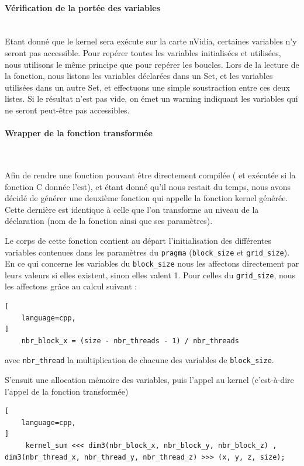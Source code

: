 \documentclass{article}
\begin{document}
	
	\paragraph{Vérification de la portée des variables}
	~~\\
	\indent
	Etant donné que le kernel sera exécute sur la carte nVidia, certaines variables n'y seront pas accessible. Pour repérer toutes les variables initialisées et utilisées, nous utilisons le même principe que pour repérer les boucles. Lors de la lecture de la fonction, nous listons les variables déclarées dans un Set, et les variables utilisées dans un autre Set, et effectuons une simple soustraction entre ces deux listes. Si le résultat n'est pas vide, on émet un warning indiquant les variables qui ne seront peut-être pas accessibles.

		
	
	\paragraph{Wrapper de la fonction transformée}
	~~\\
	\indent
	
	Afin de rendre une fonction pouvant être directement compilée ( et exécutée si la fonction C donnée l'est), et étant donné qu'il nous restait du temps, nous avons décidé de générer une deuxième fonction qui appelle la fonction kernel générée. Cette dernière est identique à celle que l'on transforme au niveau de la déclaration (nom de la fonction ainsi que ses paramètres).
	
	Le corps de cette fonction contient au départ l'initialisation des différentes variables contenues dans les paramètres du \verb|pragma| (\verb|block_size| et \verb|grid_size|).
	En ce qui concerne les variables du \verb|block_size| nous les affectons directement par leurs valeurs si elles existent, sinon elles valent 1.
	Pour celles du \verb|grid_size|, nous les affectons grâce au calcul suivant : 
	\begin{lstlisting}[
    language=cpp,
]
	nbr_block_x = (size - nbr_threads - 1) / nbr_threads
\end{lstlisting}	
	 avec \verb|nbr_thread| la multiplication de chacune des variables de \verb|block_size|.
	
	S'ensuit une allocation mémoire des variables, puis l'appel au kernel (c'est-à-dire l'appel de la fonction transformée)
	\begin{lstlisting}[
    language=cpp,
]
	 kernel_sum <<< dim3(nbr_block_x, nbr_block_y, nbr_block_z) , dim3(nbr_thread_x, nbr_thread_y, nbr_thread_z) >>> (x, y, z, size);
\end{lstlisting}	
\end{document}
